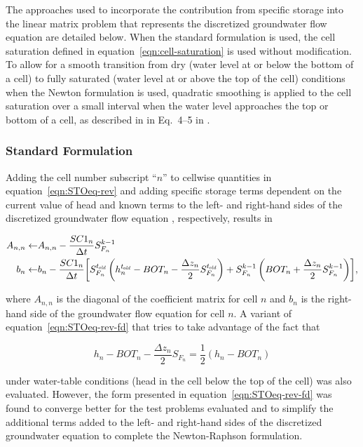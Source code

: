 The approaches used to incorporate the contribution from specific storage into the linear matrix problem that represents the discretized groundwater flow equation are detailed below. When the standard formulation is used, the cell saturation defined in equation~\ref{eqn:cell-saturation} is used without modification. To allow for a smooth transition from dry (water level at or below the bottom of a cell) to fully saturated (water level at or above the top of the cell) conditions when the Newton formulation is used, quadratic smoothing is applied to the cell saturation over a small interval when the water level approaches the top or bottom of a cell, as described in in Eq.~4--5 in \cite{modflow6gwf}. 

\subsubsection{Standard Formulation}

Adding the cell number subscript ``$n$'' to cellwise quantities in equation~\ref{eqn:STOeq-rev} and adding specific storage terms dependent on the current value of head and known terms to the left- and right-hand sides of the discretized groundwater flow equation \citep[eq. 6--1]{modflow6gwf}, respectively, results in

\begin{equation}
	\label{eqn:STOeq-rev-fd}
	\begin{aligned}
		A_{n,n} \leftarrow & A_{n,n} - \frac{SC1_n}{\Delta t} S_{F_n}^{k-1} \\
		b_n \leftarrow & b_n - \frac{SC1_n}{\Delta t} \biggl[ S_{F_n}^{t_\mathit{\kern -0.07em old}} \left( h_n^{t_\mathit{\kern -0.07em old}} - BOT_n - \frac{\Delta z_n}{2} S_{F_n}^{t_\mathit{\kern -0.07em old}} \right) +  S_{F_n}^{k-1} \left( BOT_n + \frac{\Delta z_n}{2} S_{F_n}^{k-1} \right) \biggr],
	\end{aligned}
\end{equation} 

\noindent where $A_{n,n}$ is the diagonal of the coefficient matrix for cell $n$ and $b_n$ is the right-hand side of the groundwater flow equation for cell $n$. A variant of equation~\ref{eqn:STOeq-rev-fd} that tries to take advantage of the fact that

\begin{equation}
	\label{eqn:hterm-WTconditions}
	h_n - BOT_n - \frac{\Delta z_n}{2} S_{F_n} = \frac{1}{2} \left( h_n - BOT_n \right)
\end{equation}

\noindent under water-table conditions (head in the cell below the top of the cell) was also evaluated. However, the form presented in equation~\ref{eqn:STOeq-rev-fd} was found to converge better for the test problems evaluated and to simplify the additional terms added to the left- and right-hand sides of the discretized groundwater equation to complete the Newton-Raphson formulation.


